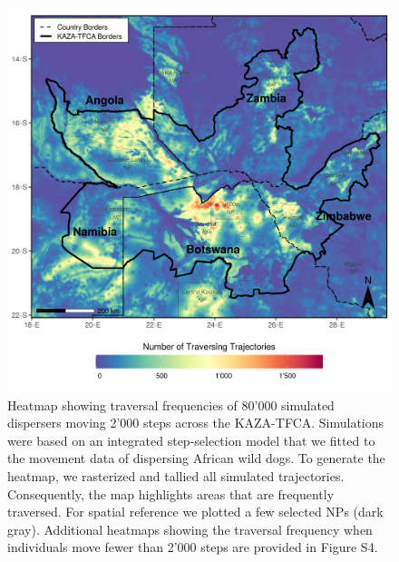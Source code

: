 \documentclass[abstract=on,10pt,a4paper,bibliography=totocnumbered]{article}
\begin{document}
\begin{figure}
  \includegraphics[width=\textwidth]{99_Heatmap.png}
  \caption{Heatmap showing traversal frequencies of 80'000 simulated dispersers
  moving 2'000 steps across the KAZA-TFCA. Simulations were based on an
  integrated step-selection model that we fitted to the movement data of
  dispersing African wild dogs. To generate the heatmap, we rasterized and
  tallied all simulated trajectories. Consequently, the map highlights areas
  that are frequently traversed. For spatial reference we plotted a few selected
  NPs (dark gray). Additional heatmaps showing the traversal frequency when
  individuals move fewer than 2'000 steps are provided in Figure S4.}
  \label{Heatmap}
\end{figure}
\end{document}
